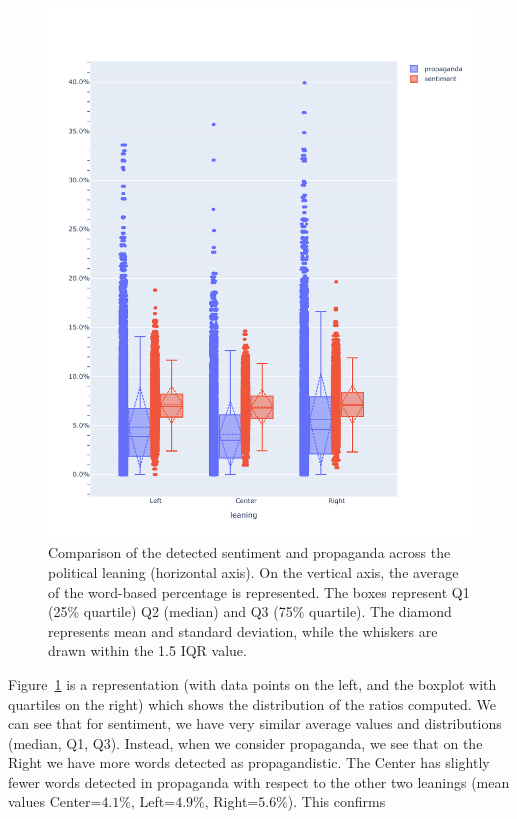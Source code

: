 \begin{figure}[!htbp]
    \centering
    \includegraphics[width=\linewidth]{figures/prop_sent_tech_across_leaning_headlines_mod.pdf} %
    \caption{Comparison of the detected sentiment and propaganda across the political leaning (horizontal axis). On the vertical axis, the average of the word-based percentage is represented. The boxes represent Q1 (25\% quartile) Q2 (median) and Q3 (75\% quartile). The diamond represents mean and standard deviation, while the whiskers are drawn within the 1.5 IQR value.}
    \label{fig:prop_sent_across_leaning}
\end{figure}


Figure~\ref{fig:prop_sent_across_leaning} is a representation (with data points on the left, and the boxplot with quartiles on the right) which shows the distribution of the ratios computed. We can see that for sentiment, we have very similar average values and distributions (median, Q1, Q3).
Instead, when we consider propaganda, we see that on the Right we have more words detected as propagandistic.
The Center has slightly fewer words detected in propaganda with respect to the other two leanings (mean values Center=$4.1\%$, Left=$4.9\%$, Right=$5.6\%$).
This confirms 

